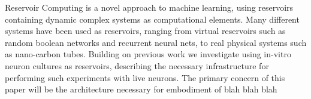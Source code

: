 Reservoir Computing is a novel approach to machine learning, using reservoirs
containing dynamic complex systems as computational elements. 
\cite{schrauwen_overview_2007}
Many different systems have been used as reservoirs, ranging from
virtual reservoirs such as random boolean networks and recurrent neural nets,
to real physical systems such as nano-carbon tubes.
Building on previous work we investigate using in-vitro neuron cultures as
reservoirs, describing the necessary infrastructure for performing such
experiments with live neurons. The primary concern of this paper will be the
architecture necessary for embodiment of blah blah blah